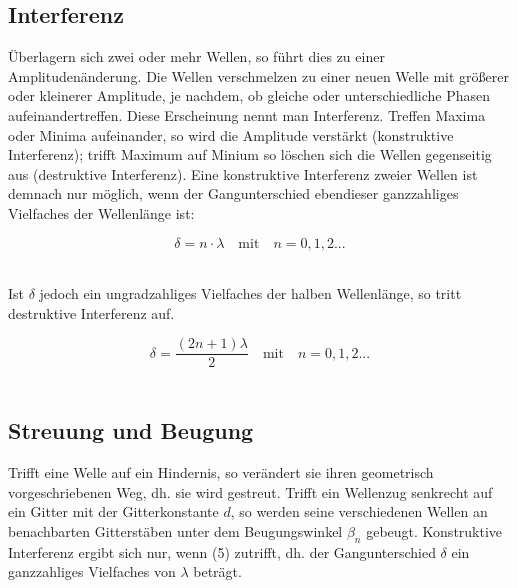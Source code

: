 \documentclass[12pt,a4paper,titlepage,headinclude,bibtotoc]{scrartcl}
\begin{document}
\subsection{Interferenz}
Überlagern sich zwei oder mehr Wellen, so führt dies zu einer Amplitudenänderung. Die Wellen verschmelzen zu einer neuen Welle mit größerer oder kleinerer Amplitude, je nachdem, ob gleiche oder unterschiedliche Phasen aufeinandertreffen. Diese Erscheinung nennt man Interferenz. Treffen Maxima oder Minima aufeinander, so wird die Amplitude verstärkt (konstruktive Interferenz); trifft Maximum auf Minium so löschen sich die Wellen gegenseitig aus (destruktive Interferenz). 
Eine konstruktive Interferenz zweier Wellen ist demnach nur möglich, wenn der Gangunterschied ebendieser ganzzahliges Vielfaches der Wellenlänge ist:\\
\par
\begin{equation}
\delta={n}\cdot {\lambda} \quad \mathrm{mit}\quad n = 0,1,2...
\end{equation}
\\
\par

Ist $\delta$ jedoch ein ungradzahliges Vielfaches der halben Wellenlänge, so tritt destruktive Interferenz auf. \\
\par
\begin{equation}
\delta = \frac{(2n+1)\lambda}{2} \quad \mathrm{mit}\quad  n=0,1,2...
\end{equation}
\\
\par


\subsection{Streuung und Beugung}
Trifft eine Welle auf ein Hindernis, so verändert sie ihren geometrisch vorgeschriebenen Weg, dh. sie wird gestreut. %
Trifft ein Wellenzug senkrecht auf ein Gitter mit der Gitterkonstante $d$, so werden seine verschiedenen Wellen an benachbarten Gitterstäben unter dem Beugungswinkel $\beta_n$ gebeugt. Konstruktive Interferenz ergibt sich nur, wenn (5) zutrifft, dh. der Gangunterschied $\delta$ ein ganzzahliges Vielfaches von $\lambda$ beträgt.
\end{document}
